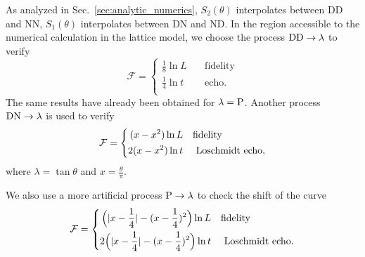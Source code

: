 As analyzed in Sec.~\ref{sec:analytic_numerics}, $S_2( \theta)$ interpolates between DD and NN, $S_1( \theta )$ interpolates between DN and ND. In the region accessible to the numerical calculation in the lattice model, we choose the process ${\rm DD} \rightarrow  \lambda$ to verify
\begin{equation}
\label{eq:result_DDDD}
\mathcal{F} = 
\left\lbrace
\begin{aligned}
\frac{1}{8}\ln L  &\quad\text{fidelity}  \\
\frac{1}{4}\ln t   &\quad \text{echo} .  \\
\end{aligned} \right.  
\end{equation}
The same results have already been obtained for $\lambda = {\rm P}$\cite{stephan_logarithmic_2013,stephan_local_2011,vasseur_universal_2014,vasseur_crossover_2013,kennes_universal_2014}. Another process $\rm{DN} \rightarrow \lambda$ {\iffalse \color{red} in Eq.~\eqref{eq:DNDN}\fi} is used to verify
\begin{equation}
\label{eq:result_DNDN}
\mathcal{F} = 
\left\lbrace
\begin{aligned}
 (x - x^2 )\ln L   &  \quad {\rm fidelity} \\
 2(x - x^2 ) \ln t  & \quad \text{ Loschmidt echo} , \\
\end{aligned} \right. 
\end{equation}
where $\lambda = \tan \theta$ and $x = \frac{\theta}{\pi}$. 

We also use a more artificial process ${\rm P} \rightarrow \lambda$ to check the shift of the curve
\begin{equation}
\label{eq:periodic-case}
\mathcal{F} = 
\left\lbrace
\begin{aligned}
  \Big(|x-\frac{1}{4}| - (x-\frac{1}{4})^2 \Big)\ln L   &  \quad {\rm fidelity} \\
  2\Big(|x-\frac{1}{4}| - (x-\frac{1}{4})^2 \Big) \ln t  & \quad \text{ Loschmidt echo} .\\
\end{aligned} \right. 
\end{equation}



